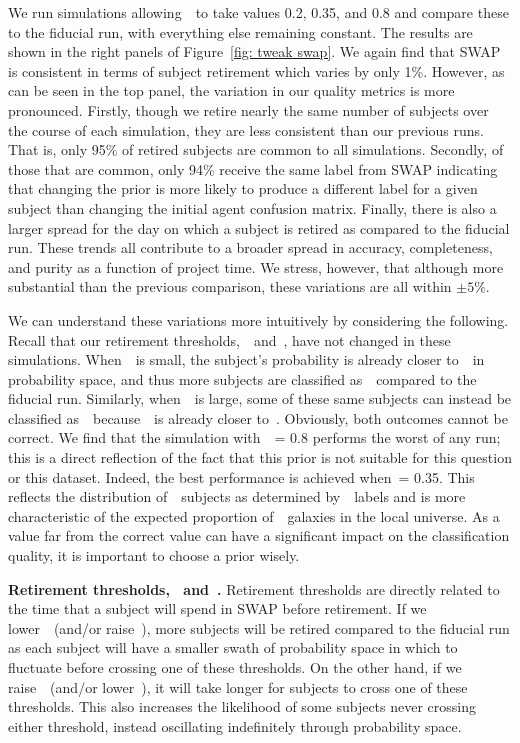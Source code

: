 We run simulations allowing~\p~to take values 0.2, 0.35, and 0.8 
and compare these to the fiducial run, with everything else remaining constant.
The results are shown in the right panels of Figure~\ref{fig: tweak swap}. 
We again find that SWAP is consistent in terms of subject retirement which varies by only 1\%. 
However, as can be seen in the top panel, the variation in our quality metrics is 
more pronounced. 
Firstly, though we retire nearly the same number of subjects over the course
of each simulation, they are less consistent than our previous runs. That is, 
only 95\% of retired subjects are common to all simulations. Secondly, of those that are 
common, only 94\% receive the same label from SWAP indicating that changing the prior 
is more likely to produce a different label for a given subject than changing the initial 
agent confusion matrix. Finally, there is also a larger spread for the day on which a subject 
is retired as compared to the fiducial run. These trends all contribute to a broader 
spread in accuracy, completeness, and purity as a function of project time.
We stress, however, that although more substantial than the previous comparison, 
these variations are all within $\pm5\%$. 

We can understand these variations more intuitively by considering the following.
Recall that our retirement thresholds,~\tf~and~\tn, have not changed in these simulations. 
When~\p~is small, the subject's probability is already closer to~\tn~in probability space, 
and thus more subjects are classified as~\notfeat~compared to the fiducial run.
Similarly, when~\p~is large, some of these same subjects can instead be classified
as~\feat~because~\p~is already closer to~\tf. Obviously, both outcomes cannot be correct. 
We find that the simulation with~\p~= 0.8 performs the worst of any run; 
this is a direct reflection of the fact that this prior is not suitable for this question or this dataset. 
 Indeed, the best performance is achieved when~\p = 0.35.  This reflects the 
distribution of~\feat~subjects as determined by~\raw~labels and is more characteristic
of the expected proportion of~\feat~galaxies in the local universe.
As a value far from the correct value can have a significant impact on the classification
quality, it is important to choose a prior wisely.
 


\textbf{Retirement thresholds, \tf~and~\tn.}
Retirement thresholds are directly related to the time that a subject will spend
in SWAP before retirement.  If we lower~\tf~(and/or raise~\tn), more subjects will be retired
compared to the fiducial run as each subject will have a smaller swath of probability space
in which to fluctuate before crossing one of these thresholds.
On the other hand, if we raise~\tf~(and/or lower~\tn), it will take longer for subjects
to cross one of these thresholds. This also increases the likelihood of some subjects 
never crossing either threshold, instead oscillating indefinitely through probability space.

